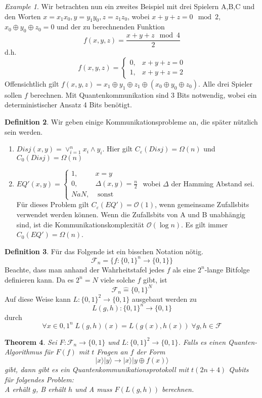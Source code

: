 \documentclass[a4paper, 12pt]{article}
\theoremstyle{plain}
\newtheorem{theorem}{Theorem}[section] %
\theoremstyle{definition}
\newtheorem{definition}[theorem]{Definition} %
\theoremstyle{lemma}
\theoremstyle{remark}
\theoremstyle{example}
\newtheorem{example}[theorem]{Example}
\begin{document}
	\begin{example}
		Wir betrachten nun ein zweites Beispiel mit drei Spielern A,B,C und den Worten $x=x_1x_0, y=y_1y_0, z = z_1z_0$, wobei $x+y+z = 0 \mod 2$, $x_0\oplus y_0\oplus z_0 = 0$ und der zu berechnenden Funktion \[f(x,y,z) = \frac{x+y+z \mod 4}{2}\] d.h. \[f(x,y,z) = \begin{cases}
			0,& x+y+z=0\\
			1,& x+y+z=2
		\end{cases}\] Offensichtlich gilt $f(x,y,z) = x_1 \oplus y_1 \oplus z_1 \oplus (x_0 \oplus y_0 \oplus z_0)$. Alle drei Spieler sollen $f$ berechnen. Mit Quantenkommunikation sind 3 Bits notwendig, wobei ein deterministischer Ansatz 4 Bits benötigt.
	\end{example}
	\begin{definition}
		Wir geben einige Kommunikationsprobleme an, die später nützlich sein werden.\\
		\begin{enumerate}
			\item $Disj(x,y) = \lor_{i=1}^n x_i \land y_i$. Hier gilt $C_\varepsilon(Disj) = \Omega(n)$ und $C_0(Disj) = \Omega(n)$
			\item $EQ'(x,y) = \begin{cases}
				1, & x=y\\
				0, & \Delta(x,y) = \frac{n}{2}\\
				NaN, & \text{ sonst}
			\end{cases}$ wobei $\Delta$ der Hamming Abstand sei. Für dieses Problem gilt $C_\varepsilon(EQ') = \mathcal{O}(1)$, wenn gemeinsame Zufallsbits verwendet werden können. Wenn die Zufallsbits von A und B unabhängig sind, ist die Kommunikationskomplexität $\mathcal{O}(\log n)$. Es gilt immer $C_0(EQ') = \Omega(n)$. 
		\end{enumerate}
	\end{definition}
	\begin{definition}
		Für das Folgende ist ein bisschen Notation nötig. \[\mathcal{F}_n = \{f:\{0,1\}^n \to \{0,1\}\}\] Beachte, dass man anhand der Wahrheitstafel jedes $f$ als eine $2^n$-lange Bitfolge definieren kann. Da es $2^n = N$ viele solche $f$ gibt, ist \[\mathcal{F}_n \hat{=} \{0,1\}^N\]
		Auf diese Weise kann $L:\{0,1\}^2 \to \{0,1\}$ ausgebaut werden zu \[L(g,h): \{0,1\}^{n} \to \{0,1\}\] durch \[\forall x \in {0,1}^n\; L(g,h)(x) = L(g(x),h(x)) \; \forall g,h \in \mathcal{F}\] 
	\end{definition}
	\begin{theorem}
		Sei $F: \mathcal{F}_n \to \{0,1\}$ und $L:\{0,1\}^2 \to \{0,1\}$. Falls es einen Quanten-Algorithmus für $F(f)$ mit $t$ Fragen an $f$ der Form \[|x\rangle|y\rangle \to |x\rangle|y\oplus f(x)\rangle\] gibt, dann gibt es ein Quantenkommunikationsprotokoll mit $t(2n+4)$ Qubits für folgendes Problem:\\
		A erhält $g$, B erhält $h$ und A muss $F(L(g,h))$ berechnen.
	\end{theorem}
\end{document}
